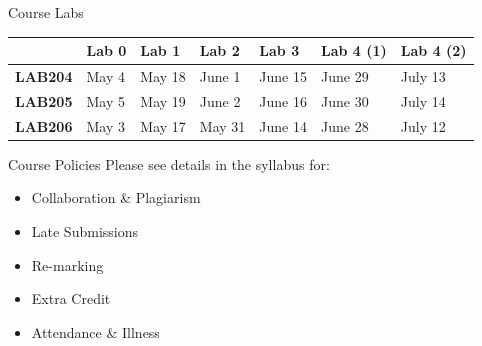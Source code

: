 \documentclass[aspectratio=169]{beamer}
\begin{document}
	
	
\begin{frame}{Course Labs}
\begin{center}	
\begin{tabular}{l|l l l l l l}
 & \textbf{Lab 0} & \textbf{Lab 1} & \textbf{Lab 2} & \textbf{Lab 3} & \textbf{Lab 4 (1)} & \textbf{Lab 4 (2)} 		\\
\hline
\textbf{LAB204} & May 4 & May 18 & June 1 & June 15 & June 29 & July 13 	\\
\hline
\textbf{LAB205} & May 5 & May 19 & June 2 & June 16 & June 30 & July 14	\\
\hline
\textbf{LAB206} & May 3 & May 17 & May 31 & June 14 & June 28 & July 12  \\
\end{tabular}	
\end{center}	
\end{frame}
  
  
  
	\begin{frame}{Course Policies}
	Please see details in the syllabus for: \\
		\begin{itemize}
			\setlength\itemsep{1em}
			\item Collaboration \& Plagiarism
			\item Late Submissions
			\item Re-marking
			\item Extra Credit
			\item Attendance \& Illness
		\end{itemize}
	\end{frame}
	
	
	
\end{document}
